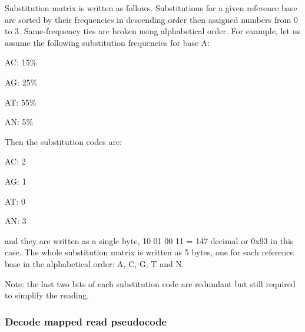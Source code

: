 \documentclass[a4paper]{article}
\begin{document}
Substitution matrix is written as follows. Substitutions for a given reference 
base are sorted by their frequencies in descending order then assigned numbers 
from 0 to 3. Same-frequency ties are broken using alphabetical order. For example, 
let us assume the following substitution frequencies for base A: 

AC: 15\%

AG: 25\%

AT: 55\%

AN: 5\%

Then the substitution codes are: 

AC: 2

AG: 1

AT: 0

AN: 3

and they are written as a single byte, 10 01 00 11 = 147 decimal or 0x93 in this 
case. The whole substitution matrix is written as 5 bytes, one for each reference 
base in the alphabetical order: A, C, G, T and N.

Note: the last two bits of each substitution code are redundant but still required 
to simplify the reading. 

\subsubsection*{Decode mapped read pseudocode}
\end{document}

